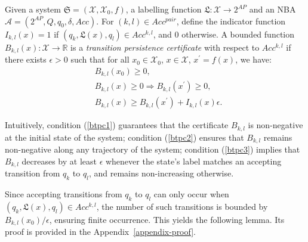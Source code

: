 \begin{definition}
  \label{transition-persistence-certificate-definition}
  Given a system $\mathfrak{S} = (\mathcal{X}, \mathcal{X}_0, f)$, a labelling function $\mathfrak{L}:\mathcal{X} \rightarrow 2^{AP}$ and an NBA $\mathcal{A} = (2^{AP}, Q, q_0, \delta, Acc)$. For $(k, l) \in Acc^{pair}$, define the indicator function $I_{k,l}(x) = 1$ if $(q_k, \mathfrak{L}(x), q_l) \in Acc^{k,l}$, and $0$ otherwise. A bounded function $B_{k, l}(x): \mathcal{X} \rightarrow \mathbb{R}$ is a \emph{transition persistence certificate} with respect to $Acc^{k,l}$ if there exists $\epsilon > 0$ such that for all $x_0 \in \mathcal{X}_0$, $x \in \mathcal{X}$, $x^{\prime} = f(x)$, we have:
  \begin{align}
    &B_{k, l}(x_0) \geq 0, \label{btpc1} \\
    &B_{k, l}(x) \geq 0 \Rightarrow B_{k, l}(x^{\prime}) \geq 0, \label{btpc2} \\
    &B_{k, l}(x) \geq B_{k, l}(x^{\prime}) + I_{k,l}(x)\epsilon. \label{btpc3}
  \end{align}
\end{definition}


Intuitively, condition (\ref{btpc1}) guarantees that the certificate $B_{k,l}$ is non-negative at the initial state of the system; condition (\ref{btpc2}) ensures that $B_{k,l}$ remains non-negative along any trajectory of the system; condition (\ref{btpc3}) implies that $B_{k,l}$ decreases by at least $\epsilon$ whenever the state's label matches an accepting transition from $q_k$ to $q_l$, and remains non-increasing otherwise.


Since accepting transitions from $q_k$ to $q_l$ can only occur when $(q_k, \mathfrak{L}(x), q_l) \in Acc^{k,l}$, the number of such transitions is bounded by $B_{k,l}(x_0)/\epsilon$, ensuring finite occurrence. This yields the following lemma. Its proof is provided in the Appendix~\ref{appendix-proof}.

